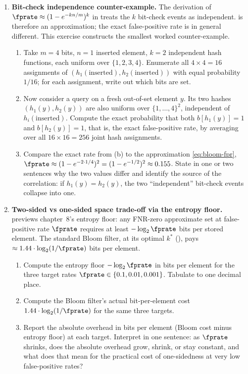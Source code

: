 \begin{enumerate}
\item \exstarstar
\label{ex:ch5-7}
\textbf{Bit-check independence counter-example.}
The derivation of $\fprate \approx (1 - e^{-kn/m})^k$ in
 treats the $k$ bit-check events as
independent.  is therefore an approximation; the
exact false-positive rate is in general different. This exercise
constructs the smallest worked counter-example.
\begin{enumerate}
  \item[(a)] Take $m = 4$ bits, $n = 1$ inserted element, $k = 2$
    independent hash functions, each uniform over $\{1, 2, 3, 4\}$.
    Enumerate all $4 \times 4 = 16$ assignments of $(h_1(\text{inserted}),
    h_2(\text{inserted}))$ with equal probability $1/16$; for each
    assignment, write out which bits are set.
  \item[(b)] Now consider a query on a fresh out-of-set element $y$.
    Its two hashes $(h_1(y), h_2(y))$ are also uniform over
    $\{1, \ldots, 4\}^2$, independent of $h_i(\text{inserted})$.
    Compute the exact probability that both $b[h_1(y)] = 1$ and
    $b[h_2(y)] = 1$, that is, the exact false-positive rate, by
    averaging over all $16 \times 16 = 256$ joint hash assignments.
  \item[(c)] Compare the exact rate from (b) to the approximation
    \eqref{eq:bloom-fpr}, $\fprate \approx (1 - e^{-2 \cdot 1/4})^2
    = (1 - e^{-1/2})^2 \approx 0.155$. State in one or two sentences
    why the two values differ and identify the source of the
    correlation: if $h_1(y) = h_2(y)$, the two ``independent''
    bit-check events collapse into one.
\end{enumerate}

\item \exstarstar
\label{ex:ch5-8}
\textbf{Two-sided vs one-sided space trade-off via the entropy floor.}
 previews chapter~8's entropy floor: any
FNR-zero approximate set at false-positive rate $\fprate$ requires at
least $-\log_2 \fprate$ bits per stored element. The standard Bloom
filter, at its optimal $k^*$ (), pays
$\approx 1.44 \cdot \log_2(1/\fprate)$ bits per element.
\begin{enumerate}
  \item[(a)] Compute the entropy floor $-\log_2 \fprate$ in bits per
    element for the three target rates $\fprate \in \{0.1, 0.01,
    0.001\}$. Tabulate to one decimal place.
  \item[(b)] Compute the Bloom filter's actual bit-per-element cost
    $1.44 \cdot \log_2(1/\fprate)$ for the same three targets.
  \item[(c)] Report the absolute overhead in bits per element (Bloom
    cost minus entropy floor) at each target. Interpret in one
    sentence: as $\fprate$ shrinks, does the absolute overhead grow,
    shrink, or stay constant, and what does that mean for the
    practical cost of one-sidedness at very low false-positive rates?
\end{enumerate}


\end{enumerate}
